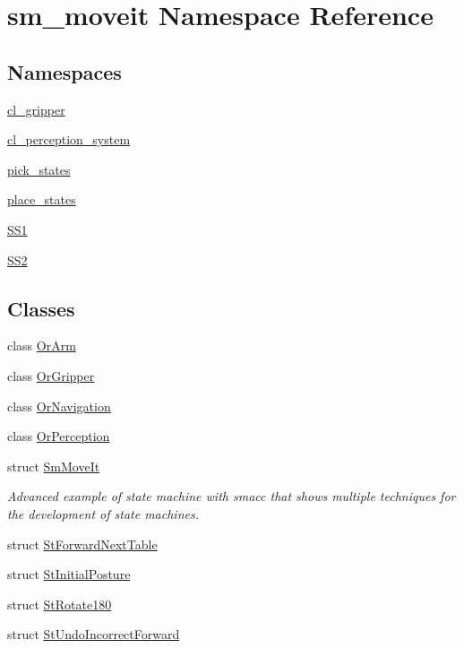 \hypertarget{namespacesm__moveit}{}\section{sm\+\_\+moveit Namespace Reference}
\label{namespacesm__moveit}
\subsection*{Namespaces}
\begin{DoxyCompactItemize}
\item 
 \hyperlink{namespacesm__moveit_1_1cl__gripper}{cl\+\_\+gripper}
\item 
 \hyperlink{namespacesm__moveit_1_1cl__perception__system}{cl\+\_\+perception\+\_\+system}
\item 
 \hyperlink{namespacesm__moveit_1_1pick__states}{pick\+\_\+states}
\item 
 \hyperlink{namespacesm__moveit_1_1place__states}{place\+\_\+states}
\item 
 \hyperlink{namespacesm__moveit_1_1SS1}{S\+S1}
\item 
 \hyperlink{namespacesm__moveit_1_1SS2}{S\+S2}
\end{DoxyCompactItemize}
\subsection*{Classes}
\begin{DoxyCompactItemize}
\item 
class \hyperlink{classsm__moveit_1_1OrArm}{Or\+Arm}
\item 
class \hyperlink{classsm__moveit_1_1OrGripper}{Or\+Gripper}
\item 
class \hyperlink{classsm__moveit_1_1OrNavigation}{Or\+Navigation}
\item 
class \hyperlink{classsm__moveit_1_1OrPerception}{Or\+Perception}
\item 
struct \hyperlink{structsm__moveit_1_1SmMoveIt}{Sm\+Move\+It}
\begin{DoxyCompactList}\small\item\em Advanced example of state machine with smacc that shows multiple techniques for the development of state machines. \end{DoxyCompactList}\item 
struct \hyperlink{structsm__moveit_1_1StForwardNextTable}{St\+Forward\+Next\+Table}
\item 
struct \hyperlink{structsm__moveit_1_1StInitialPosture}{St\+Initial\+Posture}
\item 
struct \hyperlink{structsm__moveit_1_1StRotate180}{St\+Rotate180}
\item 
struct \hyperlink{structsm__moveit_1_1StUndoIncorrectForward}{St\+Undo\+Incorrect\+Forward}
\end{DoxyCompactItemize}

